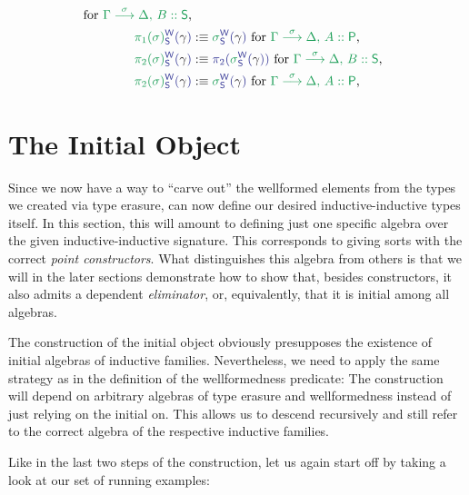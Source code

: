 \begin{defn}
\begin{align*}
  \text{ for \grm{\IISub{\sigma}{\Gamma}{\Delta,\, B :: \Sc}},} \\
\tqm{\grm{\pi_1(\sigma)}^\WW_\Sc(\blgamma)}
  &:\equiv \tqm{\grm{\sigma}^\WW_\Sc(\blgamma)}
  \text{ for \grm{\IISub{\sigma}{\Gamma}{\Delta,\, A :: \Pc}},} \\
\tqm{\grm{\pi_2(\sigma)}^\WW_\Sc(\blgamma)}
  &:\equiv \tqm{\pi_2(\grm{\sigma}^\WW_\Sc(\blgamma))}
  \text{ for \grm{\IISub{\sigma}{\Gamma}{\Delta,\, B :: \Sc}},} \\
\tqm{\grm{\pi_2(\sigma)}^\WW_\Sc(\blgamma)}
  &:\equiv \tqm{\grm{\sigma}^\WW_\Sc(\blgamma)}
  \text{ for \grm{\IISub{\sigma}{\Gamma}{\Delta,\, A :: \Pc}},}
\end{align*}

\section{The Initial Object}

Since we now have a way to ``carve out'' the wellformed elements from the types
we created via type erasure, can now define our desired inductive-inductive types
itself.
In this section, this will amount to defining just one specific algebra over the
given inductive-inductive signature.
This corresponds to giving sorts with the correct \emph{point constructors}.
What distinguishes this algebra from others is that we will in the later sections
demonstrate how to show that, besides constructors, it also admits a dependent
\emph{eliminator}, or, equivalently, that it is initial among all algebras.

The construction of the initial object obviously presupposes the existence of
initial algebras of inductive families.
Nevertheless, we need to apply the same strategy as in the definition of the
wellformedness predicate:
The construction will depend on arbitrary algebras of type erasure and wellformedness
instead of just relying on the initial on.
This allows us to descend recursively and still refer to the correct algebra
of the respective inductive families.

Like in the last two steps of the construction, let us again start off by taking
a look at our set of running examples:


\end{defn}
